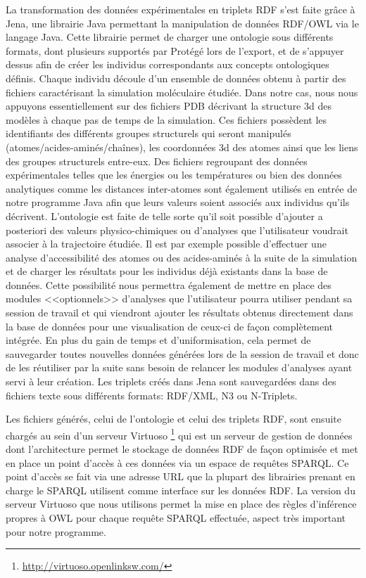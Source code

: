 La transformation des données expérimentales en triplets RDF s'est faite grâce à Jena, une librairie Java permettant la manipulation de données RDF/OWL via le langage Java. Cette librairie permet de charger une ontologie sous différents formats, dont plusieurs supportés par Protégé lors de l'export, et de s'appuyer dessus afin de créer les individus correspondants aux concepts ontologiques définis. Chaque individu découle d'un ensemble de données obtenu à partir des fichiers caractérisant la simulation moléculaire étudiée. Dans notre cas, nous nous appuyons essentiellement sur des fichiers PDB décrivant la structure 3d des modèles à chaque pas de temps de la simulation. Ces fichiers possèdent les identifiants des différents groupes structurels qui seront manipulés (atomes/acides-aminés/chaînes), les coordonnées 3d des atomes ainsi que les liens des groupes structurels entre-eux. Des fichiers regroupant des données expérimentales telles que les énergies ou les températures ou bien des données analytiques comme les distances inter-atomes sont également utilisés en entrée de notre programme Java afin que leurs valeurs soient associés aux individus qu'ils décrivent. L'ontologie est faite de telle sorte qu'il soit possible d'ajouter a posteriori des valeurs physico-chimiques ou d'analyses que l'utilisateur voudrait associer à la trajectoire étudiée. Il est par exemple possible d'effectuer une analyse d'accessibilité des atomes ou des acides-aminés à la suite de la simulation et de charger les résultats pour les individus déjà existants dans la base de données. Cette possibilité nous permettra également de mettre en place des modules <<optionnels>> d'analyses que l'utilisateur pourra utiliser pendant sa session de travail et qui viendront ajouter les résultats obtenus directement dans la base de données pour une visualisation de ceux-ci de façon complètement intégrée. En plus du gain de temps et d'uniformisation, cela permet de sauvegarder toutes nouvelles données générées lors de la session de travail et donc de les réutiliser par la suite sans besoin de relancer les modules d'analyses ayant servi à leur création.
Les triplets créés dans Jena sont sauvegardées dans des fichiers texte sous différents formats: RDF/XML, N3 ou N-Triplets. 

Les fichiers générés, celui de l'ontologie et celui des triplets RDF, sont ensuite chargés au sein d'un serveur Virtuoso \footnote{\url{http://virtuoso.openlinksw.com/}} qui est un serveur de gestion de données dont l'architecture permet le stockage de données RDF de façon optimisée et met en place un point d'accès à ces données via un espace de requêtes SPARQL. Ce point d'accès se fait via une adresse URL que la plupart des librairies prenant en charge le SPARQL utilisent comme interface sur les données RDF. La version du serveur Virtuoso que nous utilisons permet la mise en place des règles d'inférence propres à OWL pour chaque requête SPARQL effectuée, aspect très important pour notre programme.

